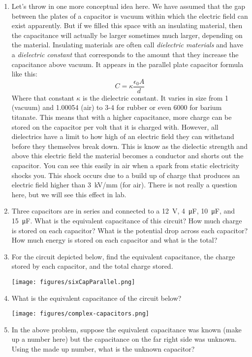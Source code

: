\begin{enumerate}
\item
Let's throw in one more conceptual idea here. We have assumed that the gap between the plates of a capacitor is vacuum within which the electric field can exist apparently. But if we filled this space with an insulating material, then the capacitance will actually be larger sometimes much larger, depending on the material. Insulating materials are often call \emph{dielectric materials} and have a \emph{dielectric constant} that corresponds to the amount that they increase the capacitance above vacuum. It appears in the parallel plate capacitor formula like this:
\[C = \kappa \frac{\epsilon_0 A}{d}\]
Where that constant $\kappa$ is the dielectric constant. It varies in size from 1 (vacuum) and 1.00054 (air) to 3-4 for rubber or even 6000 for barium titanate. This means that with a higher capacitance, more charge can be stored on the capacitor per volt that it is charged with. However, all dielectrics have a limit to how high of an electric field they can withstand before they themselves break down. This is know as the dielectic strength and above this electric field the material becomes a conductor and shorts out the capacitor. You can see this easily in air when a spark from static electricity shocks you. This shock occurs due to a build up of charge that produces an electric field higher than \SI{3}{kV/mm} (for air). There is not really a question here, but we will see this effect in lab.

\item 
Three capacitors are in series and connected to a \SI{12}{\volt}, \SI{4}{\micro\farad}, \SI{10}{\micro\farad}, and \SI{15}{\micro\farad}. What is the equivalent capacitance of this circuit? How much charge is stored on each capacitor? What is the potential drop across each capacitor? How much energy is stored on each capacitor and what is the total? \hugeskip

\clearpage
\item
For the circuit depicted below, find the equivalent capacitance, the charge stored by each capacitor, and the total charge stored.

\texttt{[image: figures/sixCapParallel.png]}


\item
What is the equivalent capacitance of the circuit below?

\texttt{[image: figures/complex-capacitors.png]}

\item
In the above problem, suppose the equivalent capacitance was known (make up a number here) but the capacitance on the far right side was unknown. Using the made up number, what is the unknown capacitor?


\end{enumerate}
